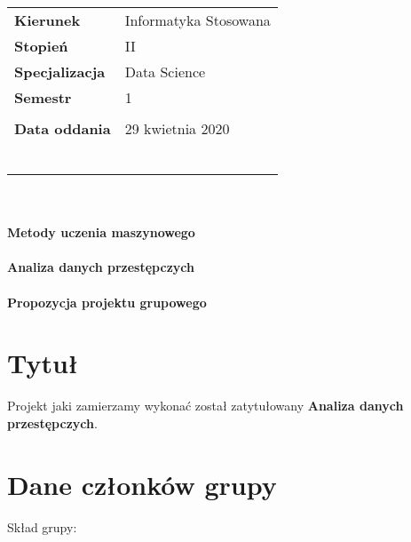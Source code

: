 \documentclass[a4paper,11pt]{article}
\begin{document}
\begin{titlepage}
\vspace{25px}

\begin{tabular}{ll}
\LARGE{\textbf{Kierunek}}& \LARGE{Informatyka Stosowana} \\
\LARGE{\textbf{Stopień}}& \LARGE{II} \\
\LARGE{\textbf{Specjalizacja}}& \LARGE{Data Science} \\
\LARGE{\textbf{Semestr}}& \LARGE{1} \\\\
\LARGE{\textbf{Data oddania}}& \LARGE{29 kwietnia 2020} \\\\\\\\\\\\\\
\end{tabular}

\begin{center}
\textbf{\huge{\\~\\Metody uczenia maszynowego}}
\textbf{\Huge{\\~\\Analiza danych przestępczych}}
\textbf{\Large{\\~\\Propozycja projektu grupowego}}
\end{center}

\end{titlepage}

\setcounter{page}{2}
\newpage
{}



\section{Tytuł} \label{sec:tytuł}

Projekt jaki zamierzamy wykonać został zatytułowany \textbf{Analiza danych przestępczych}.


\section{Dane członków grupy} \label{sec:dane}

Skład grupy:
\end{document}
